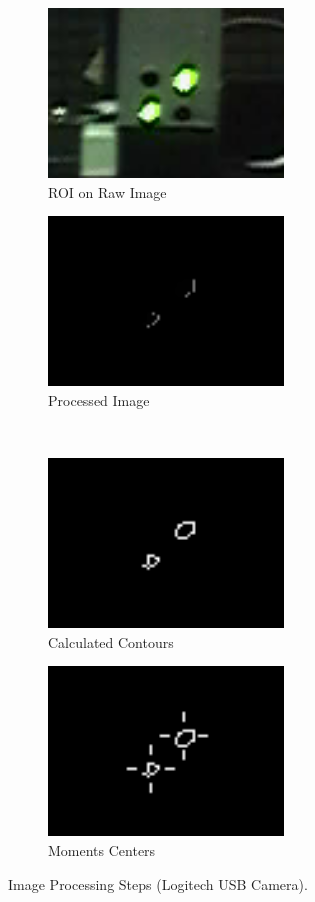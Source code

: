 \documentclass[botnum, fleqn]{unmeethesis}
\begin{document}
\small
\begin{figure}
    \begin{subfigure}{0.49\textwidth}
        \centering
        \includegraphics[height=45mm]{figures/vis.png}
        \caption{\small ROI on Raw Image}
    \end{subfigure}
    \begin{subfigure}{0.49\textwidth}
        \centering
        \includegraphics[height=45mm]{figures/proces.png}
        \caption{\small Processed Image}
    \end{subfigure} \\
    \begin{subfigure}{0.49\textwidth}
        \centering
        \includegraphics[height=45mm]{figures/closed.png}
        \caption{\small Calculated Contours}
    \end{subfigure}
    \begin{subfigure}{0.49\textwidth}
        \centering
        \includegraphics[height=45mm]{figures/contLines.png}
        \caption{\small Moments Centers}
    \end{subfigure}
    \caption{Image Processing Steps (Logitech USB Camera).}
\end{figure}
\end{document}
